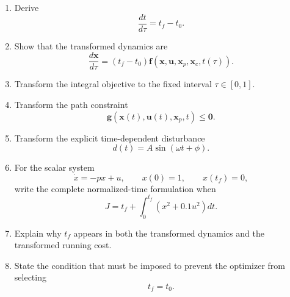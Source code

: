 \begin{enumerate}
    \item Derive
    \begin{equation}
    \frac{dt}{d\tau}=t_f-t_0.
    \end{equation}

    \item Show that the transformed dynamics are
    \begin{equation}
    \frac{d\mathbf{x}}{d\tau}
    =
    (t_f-t_0)
    \mathbf{f}
    \left(
    \mathbf{x},
    \mathbf{u},
    \mathbf{x}_p,
    \mathbf{x}_c,
    t(\tau)
    \right).
    \end{equation}

    \item Transform the integral objective to the fixed interval
    $\tau\in[0,1]$.

    \item Transform the path constraint
    \begin{equation}
    \mathbf{g}
    \left(
    \mathbf{x}(t),
    \mathbf{u}(t),
    \mathbf{x}_p,
    t
    \right)
    \leq\mathbf{0}.
    \end{equation}

    \item Transform the explicit time-dependent disturbance
    \begin{equation}
    d(t)=A\sin(\omega t+\phi).
    \end{equation}

    \item For the scalar system
    \begin{equation}
    \dot{x}=-px+u,
    \qquad
    x(0)=1,
    \qquad
    x(t_f)=0,
    \end{equation}
    write the complete normalized-time formulation when
    \begin{equation}
    J
    =
    t_f
    +
    \int_0^{t_f}
    \left(
    x^2+0.1u^2
    \right)dt.
    \end{equation}

    \item Explain why $t_f$ appears in both the transformed dynamics and the
    transformed running cost.

    \item State the condition that must be imposed to prevent the optimizer
    from selecting
    \begin{equation}
    t_f=t_0.
    \end{equation}
\end{enumerate}


